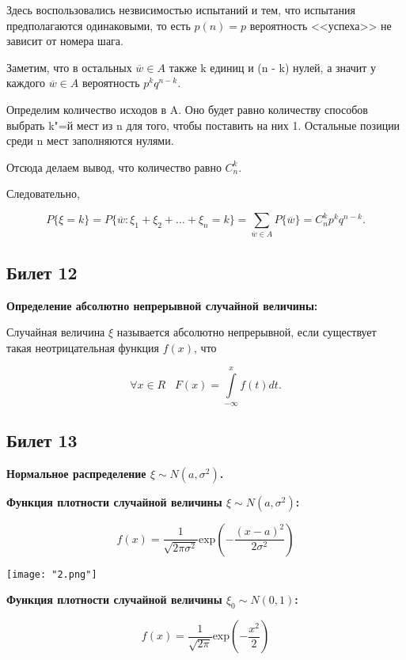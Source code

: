 Здесь воспользовались незвисимостью испытаний и тем, что 
испытания предполагаются одинаковыми, то есть $p(n) = p$ вероятность
<<успеха>> не зависит от номера шага.
\bigskip

Заметим, что в остальных $\overline{w} \in A$ также k единиц и (n - k)
нулей, а значит у каждого $\overline{w} \in A$ вероятность 
$p^k q^{n - k}$.
\bigskip

Определим количество исходов в A. Оно будет равно количеству способов
выбрать k"=й мест из n для того, чтобы поставить на них 1. Остальные
позиции среди n мест заполняются нулями.
\smallskip

Отсюда делаем вывод, что количество равно $C^k_n$.
\smallskip

Следовательно,

\[
P\{\xi = k\} = P\{\overline{w}: \xi_1 + \xi_2 + \dots +
\xi_n = k\} = \sum_{\overline{w} \in A} P\{\overline{w}\} =
C^k_n p^k q^{n - k}.
\]

\subsection{Билет 12}

\textbf{Определение абсолютно непрерывной случайной величины:}
\smallskip

Случайная величина $\xi$ называется абсолютно непрерывной,
если существует такая неотрицательная функция $f(x)$, что

\[
    \forall x \in R \;\;\; F(x) = \int\limits^x_{-\infty} f(t) dt.  
\]
\bigskip

\subsection{Билет 13}

\textbf{Нормальное распределение $\xi \sim N(a, \sigma^2)$.}
\bigskip

\textbf{Функция плотности случайной величины $\xi \sim N(a,
\sigma^2)$:}
\smallskip

\[
    f(x) = \frac{1}{\sqrt{2 \pi \sigma^2}}
    {\text{exp}\left(-\frac{(x - a)^2}{2 \sigma^2}\right)}
\]

\begin{center}
    \texttt{[image: "2.png"]}
\end{center}
\bigskip

\textbf{Функция плотности случайной величины $\xi_0 \sim N(0, 1)$:}
\smallskip   

\[
    f(x) = \frac{1}{\sqrt{2 \pi}}
    {\text{exp}\left(-\frac{x^2}{2}\right)}
\]
\bigskip

